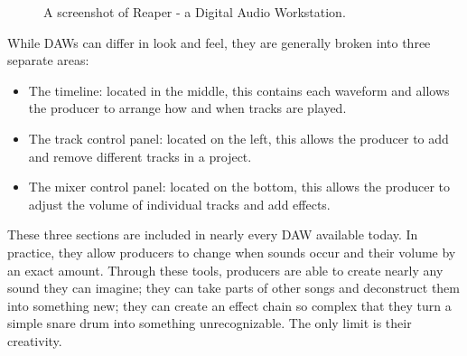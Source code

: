\begin{figure}[h] %
	\begin{center}
		\caption{A screenshot of Reaper - a Digital Audio Workstation.}
	\end{center}
\end{figure}

While DAWs can differ in look and feel, they are generally broken into three separate areas:

\begin{itemize}
  \item The timeline: located in the middle, this contains each waveform and allows the producer to arrange how and when tracks are played.
  \item The track control panel: located on the left, this allows the producer to add and remove different tracks in a project.
  \item The mixer control panel: located on the bottom, this allows the producer to adjust the volume of individual tracks and add effects.
\end{itemize}

These three sections are included in nearly every DAW available today. In practice, they allow producers to change when sounds occur and their volume by an exact amount. Through these tools, producers are able to create nearly any sound they can imagine; they can take parts of other songs and deconstruct them into something new; they can create an effect chain so complex that they turn a simple snare drum into something unrecognizable. The only limit is their creativity.
